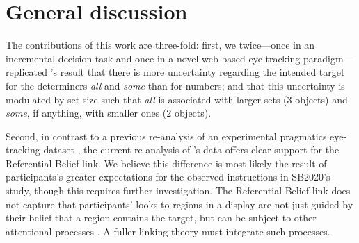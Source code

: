 \documentclass[10pt,letterpaper]{article}
\begin{document}
\section{General discussion}

The contributions of this work are three-fold: first, we twice---once in an incremental decision task and once in a novel web-based eye-tracking paradigm---replicated  's result that there is more uncertainty regarding the intended target for the determiners \emph{all} and \emph{some} than for numbers; and that this uncertainty is modulated by set size such that \emph{all} is associated with larger sets (3 objects) and \emph{some}, if anything, with smaller ones (2 objects). 

Second,  in  contrast to a previous re-analysis of an experimental pragmatics eye-tracking dataset \cite{QingLD2018}, the current re-analysis of 's data offers clear support for the Referential Belief link.  We believe this difference is most likely the result of participants's greater expectations for the observed instructions in SB2020's study, though this requires further investigation. %
The Referential Belief link does not capture that participants' looks to regions in a display are not just guided by their belief that a region contains the target, but can be subject to other attentional processes \cite{Allopenna1998}. A fuller linking theory must integrate such processes.

\end{document}
